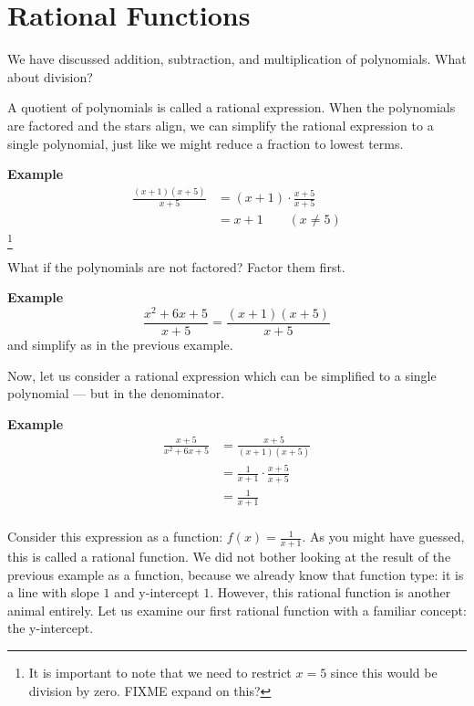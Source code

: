 \chapter{Rational Functions}

We have discussed addition, subtraction, and multiplication of polynomials. What about division?

A quotient of polynomials is called a rational expression. When the polynomials are factored and the stars align, we can simplify the rational expression to a single polynomial, just like we might reduce a fraction to lowest terms.

\textbf{Example} 
\begin{equation} \label{eq1}
\begin{split}
\frac{(x + 1)(x + 5)}{x + 5} & = (x + 1) \cdot \frac{x+5}{x+5} \\
& = x + 1 \qquad (x\ne5)
\end{split}
\end{equation}\footnote{It is important to note that we need to restrict $x=5$ since this would be division by zero. FIXME expand on this?}

What if the polynomials are not factored? Factor them first.

\textbf{Example} 
\[ \frac{x^2 + 6x + 5}{x + 5} = \frac{(x + 1)(x + 5)}{x + 5} \]
and simplify as in the previous example.

Now, let us consider a rational expression which can be simplified to a single polynomial --- but in the denominator.

\textbf{Example}
\begin{equation} \label{eq1}
\begin{split}
\frac{x + 5}{x^2 + 6x + 5} & = \frac{x + 5}{(x + 1)(x + 5)} \\
& = \frac{1}{x+1} \cdot \frac{x+5}{x+5} \\
& = \frac{1}{x+1} \\
\end{split}
\end{equation}

Consider this expression as a function: \( f(x) = \frac{1}{x+1} \). As you might have guessed, this is called a rational function. We did not bother looking at the result of the previous example as a function, because we already know that function type: it is a line with slope \( 1 \) and y-intercept \( 1 \). However, this rational function is another animal entirely. Let us examine our first rational function with a familiar concept: the y-intercept. 

